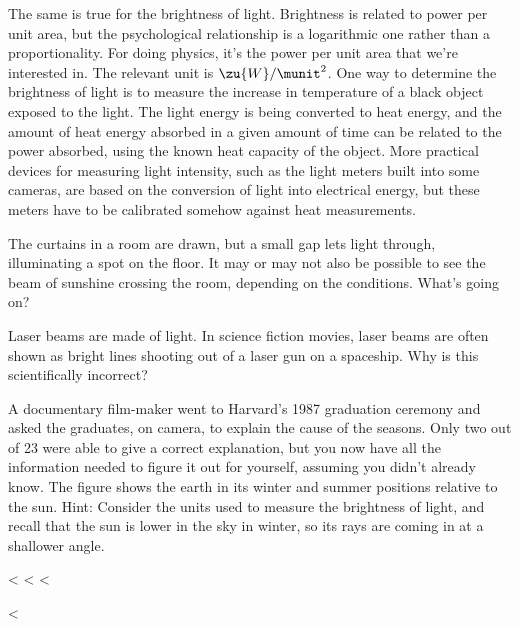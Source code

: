 The same is true for the brightness of light. Brightness is
related to power per unit area, but the psychological
relationship is a logarithmic one rather than a proportionality.
For doing physics, it's the power per unit area that we're
interested in. The relevant unit is $\zu{W}/\munit^2$.
One way to determine the brightness of light is to
measure the increase in temperature of a black object
exposed to the light. The light energy is being converted to
heat energy, and the amount of heat energy absorbed in a
given amount of time can be related to the power absorbed,
using the known heat capacity of the object. More practical
devices for measuring light intensity, such as the light
meters built into some cameras, are based on the conversion
of light into electrical energy, but these meters have to be
calibrated somehow against heat measurements.

\startdqs

\begin{dq}
The curtains in a room are drawn, but a small gap lets
light through, illuminating a spot on the floor. It may or
may not also be possible to see the beam of sunshine
crossing the room, depending on the conditions. What's going on?
\end{dq}

\begin{dq}
Laser beams are made of light. In science fiction movies,
laser beams are often shown as bright lines shooting out of
a laser gun on a spaceship. Why is this scientifically incorrect?
\end{dq}

\begin{dq}\label{dq:seasons}
A documentary film-maker went to Harvard's 1987 graduation
ceremony and asked the graduates, on camera, to explain the
cause of the seasons. Only two out of 23 were able to give a
correct explanation, but you now have all the information
needed to figure it out for yourself, assuming you didn't
already know. The figure shows the earth in its winter and
summer positions relative to the sun. Hint: Consider the
units used to measure the brightness of light, and recall
that the sun is lower in the sky in winter, so its rays are
coming in at a shallower angle.
\end{dq}


<%
<%
<%

<%

